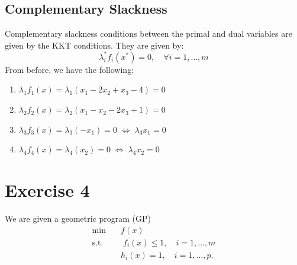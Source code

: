 \documentclass[12pt]{article}
\begin{document}
\subsection*{Complementary Slackness}

Complementary slackness conditions between the primal and dual variables are given by the KKT conditions. They are given by: \begin{equation*}
    \lambda_i^* f_i (x^*) = 0, \quad \forall i = 1, \dots, m
\end{equation*} From before, we have the following: \begin{enumerate}
    \item $\lambda_1 f_{1}(x) = \lambda_1 (x_{1} - 2 x_{2} + x_{3} - 4) = 0$
    \item $\lambda_2 f_{2}(x) = \lambda_2 (x_{1} - x_{2} - 2 x_{3} + 1) = 0$
    \item $\lambda_3 f_{3}(x) = \lambda_3 (-x_{1}) = 0 \; \Longleftrightarrow \; \lambda_3 x_{1} = 0$
    \item $\lambda_4 f_{4}(x) = \lambda_4 (x_{2}) = 0 \; \Longleftrightarrow \; \lambda_4 x_{2} = 0$
\end{enumerate}

\section*{Exercise 4}

We are given a geometric program (GP) \begin{align*}
    \min \quad & f(x) \\ 
    \text{s.t. } & \; f_i(x) \leq 1, \quad i = 1, \dots , m \\ 
    & h_i(x) = 1, \quad i = 1, \dots , p.
\end{align*}
\end{document}
